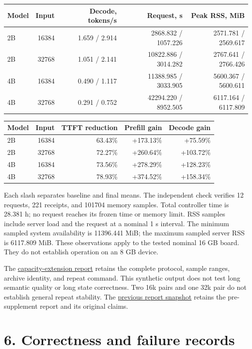 \documentclass[10pt,a4paper]{article}
\begin{document}
\begin{longtable}[]{@{}lrrrr@{}}
\toprule
Model & Input & Decode, tokens/s & Request, s & Peak RSS,
MiB\tabularnewline
\midrule
\endhead
2B & 16384 & 1.659 / 2.914 & 2868.832 / 1057.226 & 2571.781 /
2569.617\tabularnewline
2B & 32768 & 1.051 / 2.141 & 10822.886 / 3014.282 & 2767.641 /
2766.426\tabularnewline
4B & 16384 & 0.490 / 1.117 & 11388.985 / 3033.905 & 5600.367 /
5600.611\tabularnewline
4B & 32768 & 0.291 / 0.752 & 42294.220 / 8952.505 & 6117.164 /
6117.809\tabularnewline
\bottomrule
\end{longtable}

\begin{longtable}[]{@{}lrrrr@{}}
\toprule
Model & Input & TTFT reduction & Prefill gain & Decode
gain\tabularnewline
\midrule
\endhead
2B & 16384 & 63.43\% & +173.13\% & +75.59\%\tabularnewline
2B & 32768 & 72.27\% & +260.64\% & +103.72\%\tabularnewline
4B & 16384 & 73.56\% & +278.29\% & +128.23\%\tabularnewline
4B & 32768 & 78.93\% & +374.52\% & +158.34\%\tabularnewline
\bottomrule
\end{longtable}

Each slash separates baseline and final means. The independent check
verifies 12 requests, 221 receipts, and 101704 memory samples. Total
controller time is 28.381 h; no request reaches its frozen time or
memory limit. RSS samples include server load and the request at a
nominal 1 s interval. The minimum sampled system availability is
11396.441 MiB; the maximum sampled server RSS is 6117.809 MiB. These
observations apply to the tested nominal 16 GB board. They do not
establish operation on an 8 GB device.

The
\href{https://github.com/MoyaMryia/riscv-accl/blob/main/spacemit/reports/2026-10-16-ultralong-final-comparison.md}{capacity-extension
report} retains the complete protocol, sample ranges, archive identity,
and repeat command. This synthetic output does not test long semantic
quality or long state correctness. Two 16k pairs and one 32k pair do not
establish general repeat stability. The
\href{https://github.com/MoyaMryia/riscv-accl/blob/main/spacemit/reports/snapshots/2026-10-14-final-r3/SUBMISSION-REPORT.pdf}{previous
report snapshot} retains the pre-supplement report and its original
claims.

\hypertarget{correctness-and-failure-records}{%
\section{6. Correctness and failure
records}\label{correctness-and-failure-records}}
\end{document}
